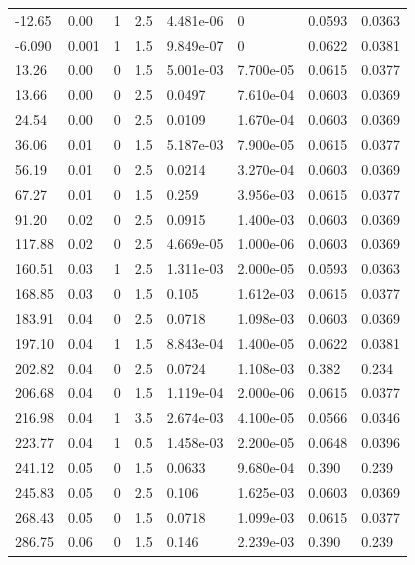 \documentclass[preview]{standalone}
\begin{document}
{{\begin{tabular}{L{1.2cm}C{1.2cm} C{0.3cm}C{0.5cm} C{1.4cm}C{1.4cm} C{1.4cm}C{1.4cm}}
  -12.65  &  0.00  & 1     & 2.5 &  4.481e-06  & 0  & 0.0593 &  0.0363   \\ 
  -6.090  &  0.001  & 1     & 1.5 &  9.849e-07  & 0  & 0.0622 &  0.0381   \\ 
  13.26  &  0.00  & 0     & 1.5 &  5.001e-03  & 7.700e-05  & 0.0615 &  0.0377   \\ 
  13.66  &  0.00  & 0     & 2.5 &  0.0497  & 7.610e-04  & 0.0603 &  0.0369   \\ 
  24.54  &  0.00  & 0     & 2.5 &  0.0109  & 1.670e-04  & 0.0603 &  0.0369   \\ 
  36.06  &  0.01  & 0     & 1.5 &  5.187e-03  & 7.900e-05  & 0.0615 &  0.0377   \\ 
  56.19  &  0.01  & 0     & 2.5 &  0.0214  & 3.270e-04  & 0.0603 &  0.0369   \\ 
  67.27  &  0.01  & 0     & 1.5 &  0.259  & 3.956e-03  & 0.0615 &  0.0377   \\ 
  91.20  &  0.02  & 0     & 2.5 &  0.0915  & 1.400e-03  & 0.0603 &  0.0369   \\ 
  117.88  &  0.02  & 0     & 2.5 &  4.669e-05  & 1.000e-06  & 0.0603 &  0.0369   \\ 
  160.51  &  0.03  & 1     & 2.5 &  1.311e-03  & 2.000e-05  & 0.0593 &  0.0363   \\ 
  168.85  &  0.03  & 0     & 1.5 &  0.105  & 1.612e-03  & 0.0615 &  0.0377   \\ 
  183.91  &  0.04  & 0     & 2.5 &  0.0718  & 1.098e-03  & 0.0603 &  0.0369   \\ 
  197.10  &  0.04  & 1     & 1.5 &  8.843e-04  & 1.400e-05  & 0.0622 &  0.0381   \\ 
  202.82  &  0.04  & 0     & 2.5 &  0.0724  & 1.108e-03  & 0.382 &  0.234   \\ 
  206.68  &  0.04  & 0     & 1.5 &  1.119e-04  & 2.000e-06  & 0.0615 &  0.0377   \\ 
  216.98  &  0.04  & 1     & 3.5 &  2.674e-03  & 4.100e-05  & 0.0566 &  0.0346   \\ 
  223.77  &  0.04  & 1     & 0.5 &  1.458e-03  & 2.200e-05  & 0.0648 &  0.0396   \\ 
  241.12  &  0.05  & 0     & 1.5 &  0.0633  & 9.680e-04  & 0.390 &  0.239   \\ 
  245.83  &  0.05  & 0     & 2.5 &  0.106  & 1.625e-03  & 0.0603 &  0.0369   \\ 
  268.43  &  0.05  & 0     & 1.5 &  0.0718  & 1.099e-03  & 0.0615 &  0.0377   \\ 
  286.75  &  0.06  & 0     & 1.5 &  0.146  & 2.239e-03  & 0.390 &  0.239   \\ 

\end{tabular}}}
\end{document}
